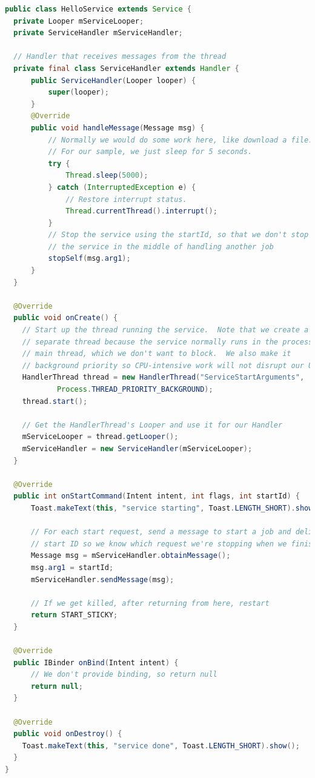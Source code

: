 \begin{lstlisting}[language=Java]
public class HelloService extends Service {
  private Looper mServiceLooper;
  private ServiceHandler mServiceHandler;

  // Handler that receives messages from the thread
  private final class ServiceHandler extends Handler {
      public ServiceHandler(Looper looper) {
          super(looper);
      }
      @Override
      public void handleMessage(Message msg) {
          // Normally we would do some work here, like download a file.
          // For our sample, we just sleep for 5 seconds.
          try {
              Thread.sleep(5000);
          } catch (InterruptedException e) {
              // Restore interrupt status.
              Thread.currentThread().interrupt();
          }
          // Stop the service using the startId, so that we don't stop
          // the service in the middle of handling another job
          stopSelf(msg.arg1);
      }
  }

  @Override
  public void onCreate() {
    // Start up the thread running the service.  Note that we create a
    // separate thread because the service normally runs in the process's
    // main thread, which we don't want to block.  We also make it
    // background priority so CPU-intensive work will not disrupt our UI.
    HandlerThread thread = new HandlerThread("ServiceStartArguments",
            Process.THREAD_PRIORITY_BACKGROUND);
    thread.start();

    // Get the HandlerThread's Looper and use it for our Handler
    mServiceLooper = thread.getLooper();
    mServiceHandler = new ServiceHandler(mServiceLooper);
  }

  @Override
  public int onStartCommand(Intent intent, int flags, int startId) {
      Toast.makeText(this, "service starting", Toast.LENGTH_SHORT).show();

      // For each start request, send a message to start a job and deliver the
      // start ID so we know which request we're stopping when we finish the job
      Message msg = mServiceHandler.obtainMessage();
      msg.arg1 = startId;
      mServiceHandler.sendMessage(msg);

      // If we get killed, after returning from here, restart
      return START_STICKY;
  }

  @Override
  public IBinder onBind(Intent intent) {
      // We don't provide binding, so return null
      return null;
  }

  @Override
  public void onDestroy() {
    Toast.makeText(this, "service done", Toast.LENGTH_SHORT).show();
  }
}
\end{lstlisting}

